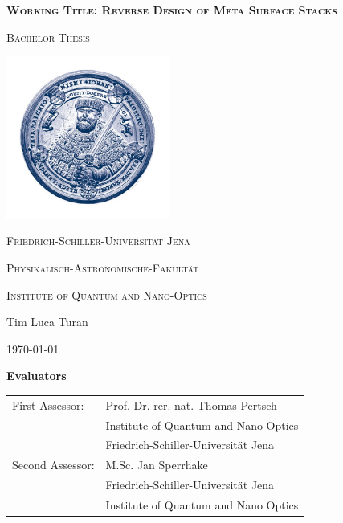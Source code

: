 \documentclass[a4paper,headsepline,11pt]{scrartcl}
\begin{document}
\setlength{\parindent}{0pt}

\begin{titlepage}
	\centering

	{\scshape\Large \textbf{Working Title: Reverse Design of Meta Surface Stacks} \par}
	\vspace{1cm}
	{\scshape\Large Bachelor Thesis \par}
	\vspace{1.5cm}
	\includegraphics[width=0.4\textwidth]{uni_jena_bildmarke_700x700}\par
	{\huge\bfseries \par}
	\vspace{10cm}
	{\scshape\large Friedrich-Schiller-Universität Jena\par}
	{\scshape\large Physikalisch-Astronomische-Fakultät\par}
	{\scshape\large Institute of Quantum and Nano-Optics\par}
	\vfill
	{\Large Tim Luca Turan}

	\vfill

	{\large \today\par}
\end{titlepage}
\thispagestyle{empty}
\vspace*{\fill}
\textbf{\Large Evaluators}\\[1.5cm]

\begin{tabular}{ll}
First Assessor: & Prof. Dr. rer. nat. Thomas Pertsch\\
 & Institute of Quantum and Nano Optics \\
 & Friedrich-Schiller-Universität Jena \\
Second Assessor: & M.Sc. Jan Sperrhake \\
 & Friedrich-Schiller-Universität Jena \\
 & Institute of Quantum and Nano Optics \\
\end{tabular}
\end{document}
